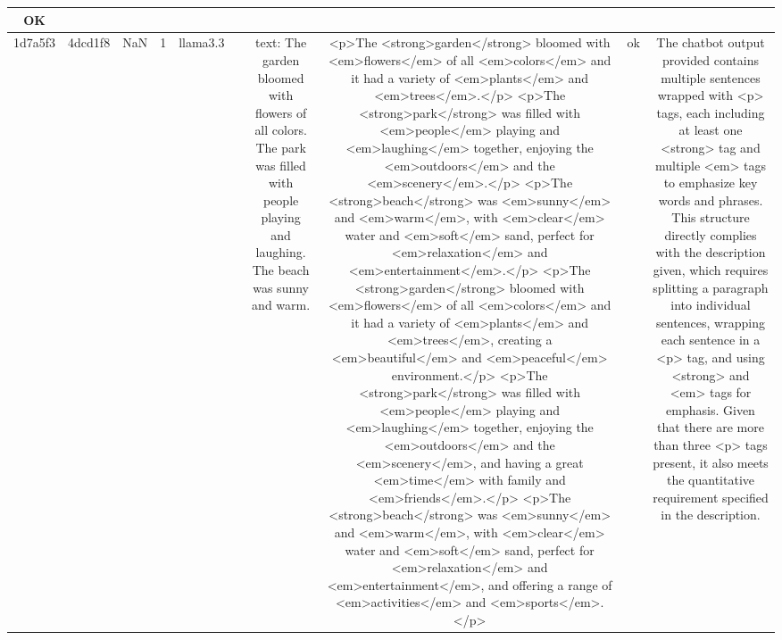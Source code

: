 \begin{table}[h!]
\begin{tabular}{|c|c|c|c|c|c|c|c|c|c|}
OK\\
\hline
1d7a5f3 & 4dcd1f8 & NaN & 1 & llama3.3 &  & text: The garden bloomed with flowers of all colors. The park was filled with people playing and laughing. The beach was sunny and warm. & <p>The <strong>garden</strong> bloomed with <em>flowers</em> of all <em>colors</em> and it had a variety of <em>plants</em> and <em>trees</em>.</p>
<p>The <strong>park</strong> was filled with <em>people</em> playing and <em>laughing</em> together, enjoying the <em>outdoors</em> and the <em>scenery</em>.</p>
<p>The <strong>beach</strong> was <em>sunny</em> and <em>warm</em>, with <em>clear</em> water and <em>soft</em> sand, perfect for <em>relaxation</em> and <em>entertainment</em>.</p>
<p>The <strong>garden</strong> bloomed with <em>flowers</em> of all <em>colors</em> and it had a variety of <em>plants</em> and <em>trees</em>, creating a <em>beautiful</em> and <em>peaceful</em> environment.</p>
<p>The <strong>park</strong> was filled with <em>people</em> playing and <em>laughing</em> together, enjoying the <em>outdoors</em> and the <em>scenery</em>, and having a great <em>time</em> with family and <em>friends</em>.</p>
<p>The <strong>beach</strong> was <em>sunny</em> and <em>warm</em>, with <em>clear</em> water and <em>soft</em> sand, perfect for <em>relaxation</em> and <em>entertainment</em>, and offering a range of <em>activities</em> and <em>sports</em>.</p> & ok & The chatbot output provided contains multiple sentences wrapped with <p> tags, each including at least one <strong> tag and multiple <em> tags to emphasize key words and phrases. This structure directly complies with the description given, which requires splitting a paragraph into individual sentences, wrapping each sentence in a <p> tag, and using <strong> and <em> tags for emphasis. Given that there are more than three <p> tags present, it also meets the quantitative requirement specified in the description.


\end{tabular}
\end{table}
